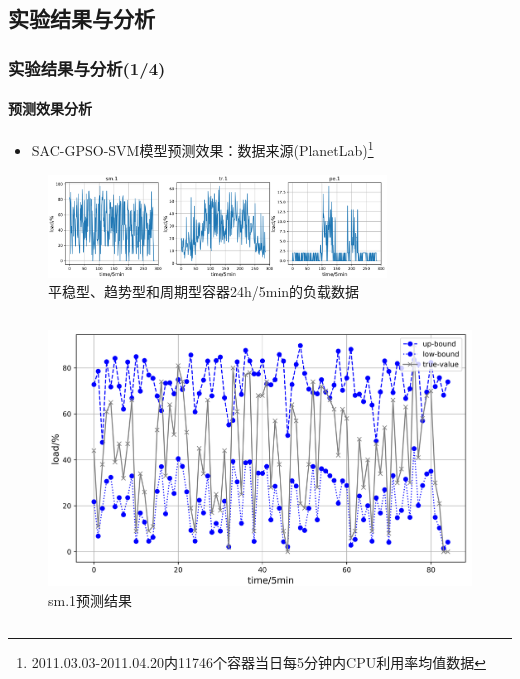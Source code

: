 \subsection{实验结果与分析}

\begin{frame}
\frametitle{实验结果与分析(1/4)}
\framesubtitle{预测效果分析}
\begin{itemize}
    \item SAC-GPSO-SVM模型预测效果：数据来源(PlanetLab)\footnote{\tiny{2011.03.03-2011.04.20内11746个容器当日每5分钟内CPU利用率均值数据}}
\end{itemize}
\begin{minipage}{\textwidth}
    \centering
    \begin{figure}[htb]
    \centering
    \includegraphics[width=0.8\textwidth]{figures/fig10_data_of_sm_tr_pe.png}
    \caption{平稳型、趋势型和周期型容器24h/5min的负载数据}
    \label{fig:fig10}
    \end{figure}
\end{minipage}
\begin{columns}[T,onlytextwidth]
\begin{column}{0.3\textwidth}
    \begin{minipage}{\textwidth}
        \begin{figure}
        \centering
        \includegraphics[width=\textwidth]{figures/fig11_a_sm_predict.png}
        \caption{sm.1预测结果}
        \label{fig:fig11_a}

\end{figure}
\end{minipage}
\end{column}
\end{columns}
\end{frame}
